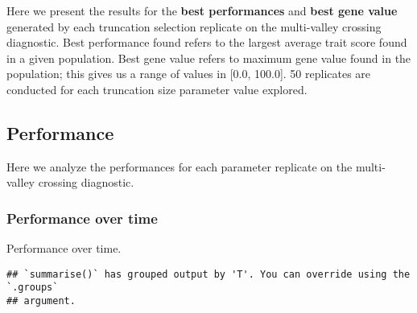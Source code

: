 \documentclass[]{book}
\newenvironment{Shaded}{\begin{snugshade}}{\end{snugshade}}
\newcommand{\DataTypeTok}[1]{\textcolor[rgb]{0.13,0.29,0.53}{#1}}
\newcommand{\KeywordTok}[1]{\textcolor[rgb]{0.13,0.29,0.53}{\textbf{#1}}}
\newcommand{\NormalTok}[1]{#1}
\newcommand{\OperatorTok}[1]{\textcolor[rgb]{0.81,0.36,0.00}{\textbf{#1}}}
\newcommand{\StringTok}[1]{\textcolor[rgb]{0.31,0.60,0.02}{#1}}
\begin{document}
Here we present the results for the \textbf{best performances} and \textbf{best gene value} generated by each truncation selection replicate on the multi-valley crossing diagnostic.
Best performance found refers to the largest average trait score found in a given population.
Best gene value refers to maximum gene value found in the population; this gives us a range of values in {[}0.0, 100.0{]}.
50 replicates are conducted for each truncation size parameter value explored.

\hypertarget{performance-3}{%
\subsection{Performance}\label{performance-3}}

Here we analyze the performances for each parameter replicate on the multi-valley crossing diagnostic.

\hypertarget{performance-over-time-5}{%
\subsubsection{Performance over time}\label{performance-over-time-5}}

Performance over time.

\begin{Shaded}
\end{Shaded}

\begin{verbatim}
## `summarise()` has grouped output by 'T'. You can override using the `.groups`
## argument.
\end{verbatim}
\end{document}
